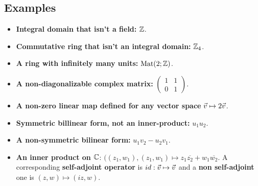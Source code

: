 \begin{multicols}{2}
\section*{Examples}
\begin{itemize}
    \item{\textbf{Integral domain that isn't a field:} $\mathbb{Z}$.}
    \item{\textbf{Commutative ring that isn't an integral domain:} $\mathbb{Z}_4$.}
    \item{\textbf{A ring with infinitely many units:} $\mathrm{Mat}(2;\mathbb{Z})$.}
    \item{\textbf{A non-diagonalizable complex matrix:} $\begin{pmatrix}1&1\\0&1\end{pmatrix}$.}
    \item{\textbf{A non-zero linear map defined for any vector space} $\vec{v}\mapsto2\vec{v}$.}
    \item{\textbf{Symmetric billinear form, not an inner-product:} $u_1u_2$.}
    \item{\textbf{A non-symmetric bilinear form:} $u_1v_2-u_2v_1$.}
    \item{\textbf{An inner product on $\mathbb{C}$}: $((z_1,w_1),(z_1,w_1)\mapsto z_1\overline{z_2} + w_1\overline{w_2}$. A corresponding \textbf{self-adjoint operator} is $id:\vec{v}\mapsto\vec{v}$ and a \textbf{non self-adjoint} one is $(z,w)\mapsto(iz,w)$.}
\end{itemize}
\end{multicols}